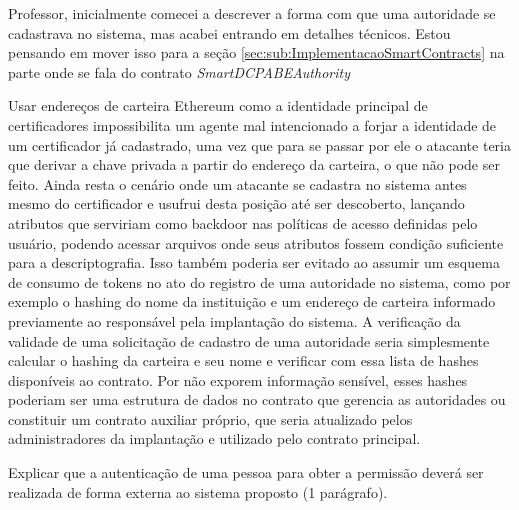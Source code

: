 \documentclass[a4paper,11pt]{article}
\begin{document}
{\color{RoyalBlue} Professor, inicialmente comecei a descrever a forma com que uma autoridade se cadastrava no sistema, mas acabei entrando em detalhes técnicos. Estou pensando em mover isso para a seção \ref{sec:sub:ImplementacaoSmartContracts} na parte onde se fala do contrato \emph{SmartDCPABEAuthority} }

Usar endereços de carteira Ethereum como a identidade principal de certificadores impossibilita um agente mal intencionado a forjar a identidade de um certificador já cadastrado, uma vez que para se passar por ele o atacante teria que derivar a chave privada a partir do endereço da carteira, o que não pode ser feito.
Ainda resta o cenário onde um atacante se cadastra no sistema antes mesmo do certificador e usufrui desta posição até ser descoberto, lançando atributos que serviriam como backdoor nas políticas de acesso definidas pelo usuário, podendo acessar arquivos onde seus atributos fossem condição suficiente para a descriptografia.
Isso também poderia ser evitado ao assumir um esquema de consumo de tokens no ato do registro de uma autoridade no sistema, como por exemplo o hashing do nome da instituição e um endereço de carteira informado previamente ao responsável pela implantação do sistema.
A verificação da validade de uma solicitação de cadastro de uma autoridade seria simplesmente calcular o hashing da carteira e seu nome e verificar com essa lista de hashes disponíveis ao contrato.
Por não exporem informação sensível, esses hashes poderiam ser uma estrutura de dados no contrato que gerencia as autoridades ou constituir um contrato auxiliar próprio, que seria atualizado pelos administradores da implantação e utilizado pelo contrato principal.

{\color{ForestGreen}Explicar que a autenticação de uma pessoa para obter a permissão deverá ser realizada de forma externa ao sistema proposto (1 parágrafo).}
\end{document}
